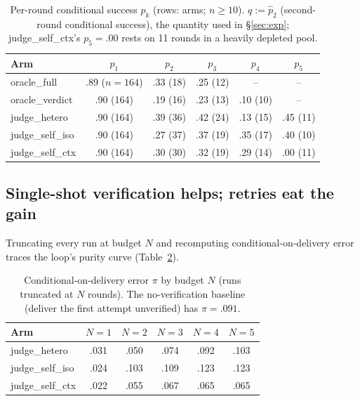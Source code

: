 \documentclass[11pt]{article}
\begin{document}
\begin{table}[t]
\centering\small
\caption{Per-round conditional success $p_k$ (rows: arms;
$n\ge10$). $q := \hat p_2$ (second-round conditional success), the
quantity used in §\ref{sec:exp}; \textsf{judge\_self\_ctx}'s
$p_5 = .00$ rests on 11 rounds in a heavily depleted pool.}
\label{tab:pk}
\begin{tabular}{lccccc}
\toprule
Arm & $p_1$ & $p_2$ & $p_3$ & $p_4$ & $p_5$\\
\midrule
oracle\_full    & .89 ($n{=}164$) & .33 (18) & .25 (12) & -- & --\\
oracle\_verdict & .90 (164) & .19 (16) & .23 (13) & .10 (10) & --\\
judge\_hetero   & .90 (164) & .39 (36) & .42 (24) & .13 (15) & .45 (11)\\
judge\_self\_iso& .90 (164) & .27 (37) & .37 (19) & .35 (17) & .40 (10)\\
judge\_self\_ctx& .90 (164) & .30 (30) & .32 (19) & .29 (14) & .00 (11)\\
\bottomrule
\end{tabular}
\end{table}

\subsection{Single-shot verification helps; retries eat the gain}
\label{sec:budget}
Truncating every run at budget $N$ and recomputing
conditional-on-delivery error traces the loop's purity curve
(Table~\ref{tab:budget}).

\begin{table}[t]
\centering\small
\caption{Conditional-on-delivery error $\pi$ by budget $N$
(runs truncated at $N$ rounds).  The no-verification baseline
(deliver the first attempt unverified) has $\pi = .091$.}
\label{tab:budget}
\begin{tabular}{lccccc}
\toprule
Arm & $N{=}1$ & $N{=}2$ & $N{=}3$ & $N{=}4$ & $N{=}5$\\
\midrule
judge\_hetero    & .031 & .050 & .074 & .092 & .103\\
judge\_self\_iso & .024 & .103 & .109 & .123 & .123\\
judge\_self\_ctx & .022 & .055 & .067 & .065 & .065\\
\bottomrule
\end{tabular}
\end{table}
\end{document}
